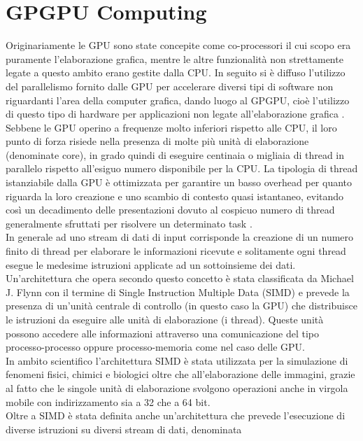 \section{GPGPU Computing}

Originariamente le GPU sono state concepite
come co-processori il cui scopo
era puramente l'elaborazione grafica, mentre le altre funzionalità
non strettamente legate a questo ambito erano gestite dalla CPU.
In seguito si è diffuso l'utilizzo del parallelismo fornito dalle GPU
per accelerare diversi tipi di software non riguardanti
l'area della computer grafica, dando luogo al GPGPU, cioè l'utilizzo di questo 
tipo di hardware
per applicazioni non legate all'elaborazione grafica \cite{nickolls2010gpu}.
Sebbene le GPU operino a frequenze molto inferiori rispetto alle CPU, il loro
punto di forza risiede nella presenza di molte più unità di elaborazione
(denominate core), in grado quindi di eseguire centinaia o migliaia di thread
in parallelo rispetto all'esiguo numero disponibile per la CPU.
La tipologia di thread
istanziabile dalla GPU è ottimizzata per garantire un basso overhead
per quanto riguarda la loro creazione e uno scambio di contesto quasi
istantaneo, evitando così un decadimento delle presentazioni dovuto al cospicuo
numero di thread generalmente sfruttati per risolvere un determinato task
\cite{kirk2007nvidia}.
\\
In generale ad uno stream di dati di input corrisponde la creazione di un
numero finito di thread per elaborare le informazioni ricevute e solitamente
ogni thread esegue le medesime istruzioni applicate ad un sottoinsieme
dei dati. Un'architettura che opera secondo questo concetto è stata
classificata da Michael J. Flynn con il termine di Single Instruction Multiple 
Data (SIMD)\cite{duncan1990survey} e prevede
la presenza di un'unità centrale di controllo (in questo caso la GPU) che
distribuisce le istruzioni da eseguire alle unità di elaborazione (i thread).
Queste unità possono accedere alle informazioni attraverso una comunicazione
del tipo processo-processo oppure processo-memoria come nel caso delle GPU.
\\
In ambito scientifico l'architettura SIMD è stata utilizzata per la simulazione
di fenomeni fisici, chimici e biologici oltre che all'elaborazione delle
immagini, grazie al fatto che le singole unità di elaborazione svolgono
operazioni anche in virgola mobile con indirizzamento sia a 32 che a 64 bit.
\\
Oltre a SIMD è stata definita anche un'architettura che prevede
l'esecuzione di diverse istruzioni su diversi stream di dati, denominata
